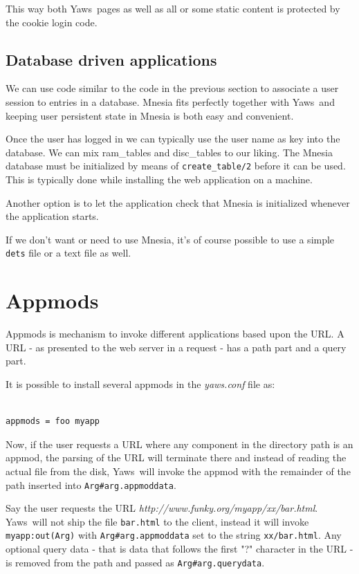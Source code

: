 \documentclass[11pt,oneside,english]{book}
\newcommand{\Yaws}            %
        {{\sc Yaws}}
\begin{document}
This way both \Yaws\  pages as well as all or some static content
is protected by the cookie login code.


\subsection{Database driven applications}

We can use code similar to the code in the previous section to associate
a user session to entries in a database. Mnesia fits perfectly
together with \Yaws\  and keeping user persistent state in Mnesia is
both easy and convenient.

Once the user has logged in we can typically use the user name
as key into the database. We can mix ram\_tables and disc\_tables
to our liking. The Mnesia database must be initialized by means
of \verb+create_table/2+ before it
can be used. This is typically done while installing the
web application on a machine.

Another option is to let the application check that Mnesia
is initialized whenever the application starts.

If we don't want or need to use Mnesia, it's of course possible
to use a simple \verb+dets+ file or a text file as well.

\section{Appmods}

Appmods is mechanism to invoke different applications
based upon the URL. A URL - as presented to the web server in
a request - has a path part and a query part.

It is possible to install several appmods in the \textit{yaws.conf}
file as:
\begin{verbatim}

appmods = foo myapp

\end{verbatim}

Now, if the user requests a URL where any component in the
directory path is an appmod, the parsing of the URL will terminate
there and instead of reading the actual file from the disk, \Yaws\  will
invoke the appmod with the remainder of the path inserted into
\verb+Arg#arg.appmoddata+.

Say the user requests the URL \textit{http://www.funky.org/myapp/xx/bar.html}.
\Yaws\  will not ship the file \verb+bar.html+ to the client, instead it
will invoke \verb+myapp:out(Arg)+ with \verb+Arg#arg.appmoddata+
set to the string \verb+xx/bar.html+. Any optional query data - that
is data that follows the first "?" character in the URL -
is removed from the path and passed as \verb+Arg#arg.querydata+.
\end{document}
